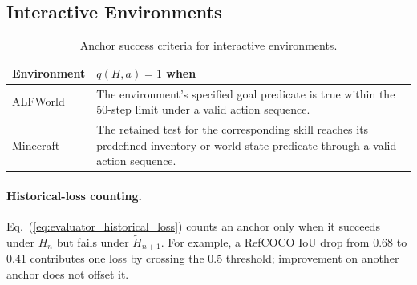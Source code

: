 \documentclass{article}
\begin{document}
\subsection{Interactive Environments}

\begin{table}[H]
\centering
\small
\caption{Anchor success criteria for interactive environments.}
\label{tab:anchor_criteria_interactive}
\begin{tabular}{p{}p{}}
\toprule
Environment & $q(H,a)=1$ when \\
\midrule
ALFWorld
& The environment's specified goal predicate is true within the 50-step limit
under a valid action sequence. \\

Minecraft
& The retained test for the corresponding skill reaches its predefined
inventory or world-state predicate through a valid action sequence. \\
\bottomrule
\end{tabular}
\end{table}

\paragraph{Historical-loss counting.}
Eq.~(\ref{eq:evaluator_historical_loss}) counts an anchor only when it succeeds
under $H_n$ but fails under $\widetilde{H}_{n+1}$. For example, a RefCOCO IoU
drop from 0.68 to 0.41 contributes one loss by crossing the 0.5 threshold;
improvement on another anchor does not offset it.
\end{document}

